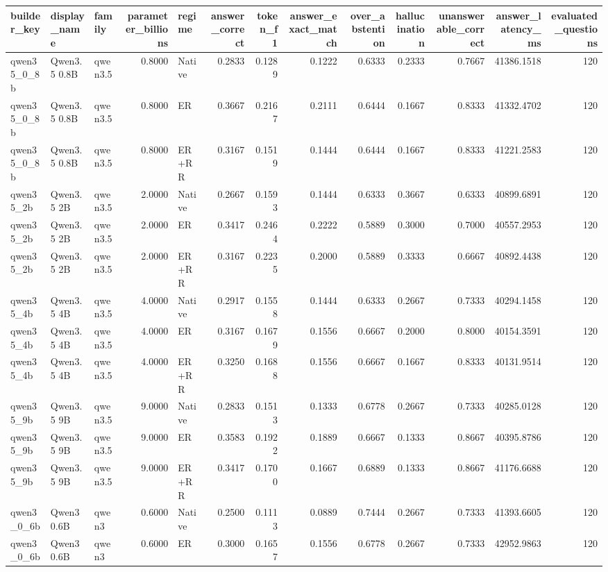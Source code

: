 \begin{tabular}{lllrlrrrrrrrr}
\toprule
builder_key & display_name & family & parameter_billions & regime & answer_correct & token_f1 & answer_exact_match & over_abstention & hallucination & unanswerable_correct & answer_latency_ms & evaluated_questions \\
\midrule
qwen35_0_8b & Qwen3.5 0.8B & qwen3.5 & 0.8000 & Native & 0.2833 & 0.1289 & 0.1222 & 0.6333 & 0.2333 & 0.7667 & 41386.1518 & 120 \\
qwen35_0_8b & Qwen3.5 0.8B & qwen3.5 & 0.8000 & ER & 0.3667 & 0.2167 & 0.2111 & 0.6444 & 0.1667 & 0.8333 & 41332.4702 & 120 \\
qwen35_0_8b & Qwen3.5 0.8B & qwen3.5 & 0.8000 & ER+RR & 0.3167 & 0.1519 & 0.1444 & 0.6444 & 0.1667 & 0.8333 & 41221.2583 & 120 \\
qwen35_2b & Qwen3.5 2B & qwen3.5 & 2.0000 & Native & 0.2667 & 0.1593 & 0.1444 & 0.6333 & 0.3667 & 0.6333 & 40899.6891 & 120 \\
qwen35_2b & Qwen3.5 2B & qwen3.5 & 2.0000 & ER & 0.3417 & 0.2464 & 0.2222 & 0.5889 & 0.3000 & 0.7000 & 40557.2953 & 120 \\
qwen35_2b & Qwen3.5 2B & qwen3.5 & 2.0000 & ER+RR & 0.3167 & 0.2235 & 0.2000 & 0.5889 & 0.3333 & 0.6667 & 40892.4438 & 120 \\
qwen35_4b & Qwen3.5 4B & qwen3.5 & 4.0000 & Native & 0.2917 & 0.1558 & 0.1444 & 0.6333 & 0.2667 & 0.7333 & 40294.1458 & 120 \\
qwen35_4b & Qwen3.5 4B & qwen3.5 & 4.0000 & ER & 0.3167 & 0.1679 & 0.1556 & 0.6667 & 0.2000 & 0.8000 & 40154.3591 & 120 \\
qwen35_4b & Qwen3.5 4B & qwen3.5 & 4.0000 & ER+RR & 0.3250 & 0.1688 & 0.1556 & 0.6667 & 0.1667 & 0.8333 & 40131.9514 & 120 \\
qwen35_9b & Qwen3.5 9B & qwen3.5 & 9.0000 & Native & 0.2833 & 0.1513 & 0.1333 & 0.6778 & 0.2667 & 0.7333 & 40285.0128 & 120 \\
qwen35_9b & Qwen3.5 9B & qwen3.5 & 9.0000 & ER & 0.3583 & 0.1922 & 0.1889 & 0.6667 & 0.1333 & 0.8667 & 40395.8786 & 120 \\
qwen35_9b & Qwen3.5 9B & qwen3.5 & 9.0000 & ER+RR & 0.3417 & 0.1700 & 0.1667 & 0.6889 & 0.1333 & 0.8667 & 41176.6688 & 120 \\
qwen3_0_6b & Qwen3 0.6B & qwen3 & 0.6000 & Native & 0.2500 & 0.1113 & 0.0889 & 0.7444 & 0.2667 & 0.7333 & 41393.6605 & 120 \\
qwen3_0_6b & Qwen3 0.6B & qwen3 & 0.6000 & ER & 0.3000 & 0.1657 & 0.1556 & 0.6778 & 0.2667 & 0.7333 & 42952.9863 & 120 \\

\end{tabular}
